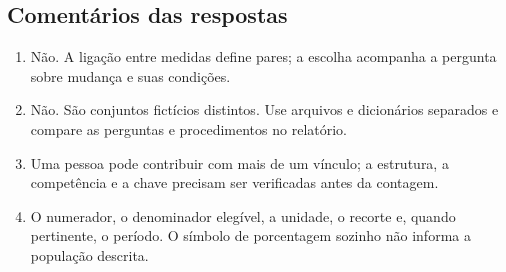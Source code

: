 \subsection*{Comentários das respostas}

\begin{enumerate}
  \item Não. A ligação entre medidas define pares; a escolha acompanha a pergunta sobre mudança e suas condições.
  \item Não. São conjuntos fictícios distintos. Use arquivos e dicionários separados e compare as perguntas e procedimentos no relatório.
  \item Uma pessoa pode contribuir com mais de um vínculo; a estrutura, a competência e a chave precisam ser verificadas antes da contagem.
  \item O numerador, o denominador elegível, a unidade, o recorte e, quando pertinente, o período. O símbolo de porcentagem sozinho não informa a população descrita.
\end{enumerate}
